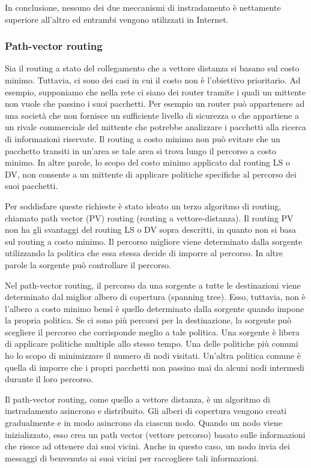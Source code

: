 In conclusione, nessuno dei due meccanismi di instradamento è nettamente superiore all’altro ed entrambi vengono utilizzati in Internet.

\subsubsection{Path-vector routing}
Sia il routing a stato del collegamento che a vettore distanza si basano sul costo minimo. Tuttavia, ci sono dei casi in cui il costo non è l'obiettivo prioritario. Ad esempio, supponiamo che nella rete ci siano dei router tramite i quali un mittente non vuole che passino i suoi pacchetti. Per esempio un router può appartenere ad una società che non fornisce un sufficiente livello di sicurezza o che appartiene a un rivale commerciale del mittente che potrebbe analizzare i pacchetti alla ricerca di informazioni riservate. Il routing a costo minimo non può evitare che un pacchetto transiti in un'area se tale area si trova lungo il percorso a costo minimo. In altre parole, lo scopo del costo minimo applicato dal routing LS o DV, non consente a un mittente di applicare politiche specifiche al percorso dei suoi pacchetti.

Per soddisfare queste richieste è stato ideato un terzo algoritmo di routing, chiamato path vector (PV) routing (routing a vettore-distanza). Il routing PV non ha gli svantaggi del routing LS o DV sopra descritti, in quanto non si basa sul routing a costo minimo. Il percorso migliore viene determinato dalla sorgente utilizzando la politica che essa stessa decide di imporre al percorso. In altre parole la sorgente può controllare il percorso.

Nel path-vector routing, il percorso da una sorgente a tutte le destinazioni viene determinato dal miglior albero di copertura (spanning tree). Esso, tuttavia, non è l'albero a costo minimo bensì è quello determinato dalla sorgente quando impone la propria politica. Se ci sono più percorsi per la destinazione, la sorgente può scegliere il percorso che corrisponde meglio a tale politica. Una sorgente è libera di applicare politiche multiple allo stesso tempo. Una delle politiche più comuni ho lo scopo di minimizzare il numero di nodi visitati. Un'altra politica comune è quella di imporre che i propri pacchetti non passino mai da alcuni nodi intermedi durante il loro percorso.

Il path-vector routing, come quello a vettore distanza, è un algoritmo di instradamento asincrono e distribuito. Gli alberi di copertura vengono creati gradualmente e in modo asincrono da ciascun nodo. Quando un nodo viene inizializzato, esso crea un path vector (vettore percorso) basato sulle informazioni che riesce ad ottenere dai suoi vicini. Anche in questo caso, un nodo invia dei messaggi di benvenuto ai suoi vicini per raccogliere tali informazioni. 


